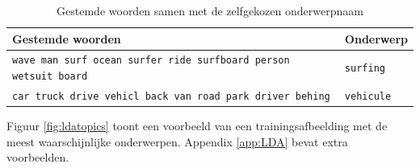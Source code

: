 \begin{table}
	
	\begin{tabular}{ll}
		Gestemde woorden                                               & Onderwerp \\ \hline
		\texttt{\small{wave man surf ocean surfer ride surfboard person wetsuit board}} & \texttt{surfing}       \\
		\texttt{\small{car truck drive vehicl back van road park driver behing}}        & \texttt{vehicule}      \\
	\end{tabular}
	\caption{Gestemde woorden samen met de zelfgekozen onderwerpnaam}	\label{tbl:woorden-naar-topic}
\end{table}

Figuur \ref{fig:ldatopics} toont een voorbeeld van een trainingsafbeelding met de meest waarschijnlijke onderwerpen. Appendix \ref{app:LDA} bevat extra voorbeelden.



